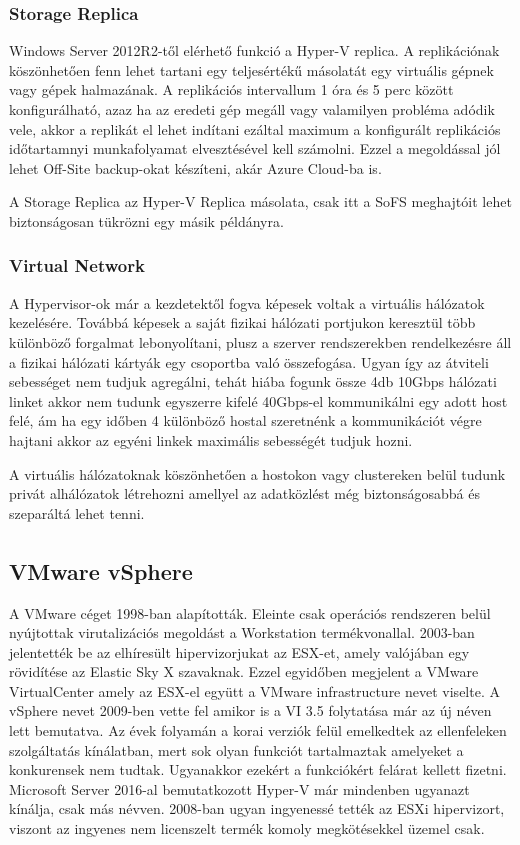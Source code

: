 \documentclass[12pt,oneside,justify,table]{book}
\begin{document}
\subsubsection{Storage Replica}

Windows Server 2012R2-től elérhető funkció a Hyper-V replica. A replikációnak köszönhetően fenn lehet tartani egy teljesértékű másolatát egy virtuális gépnek vagy gépek halmazának. A replikációs intervallum 1 óra és 5 perc között konfigurálható, azaz ha az eredeti gép megáll vagy valamilyen probléma adódik vele, akkor a replikát el lehet indítani ezáltal maximum a konfigurált replikációs időtartamnyi munkafolyamat elvesztésével kell számolni. Ezzel a megoldással jól lehet Off-Site backup-okat készíteni, akár Azure Cloud-ba is.

A Storage Replica az Hyper-V Replica másolata, csak itt a SoFS meghajtóit lehet biztonságosan tükrözni egy másik példányra.

\subsubsection{Virtual Network}

A Hypervisor-ok már a kezdetektől fogva képesek voltak a virtuális hálózatok kezelésére. Továbbá képesek a saját fizikai hálózati portjukon keresztül több különböző forgalmat lebonyolítani, plusz a szerver rendszerekben rendelkezésre áll a fizikai hálózati kártyák egy csoportba való összefogása. Ugyan így az átviteli sebességet nem tudjuk agregálni, tehát hiába fogunk össze 4db 10Gbps hálózati linket akkor nem tudunk egyszerre kifelé 40Gbps-el kommunikálni egy adott host felé, ám ha egy időben 4 különböző hostal szeretnénk a kommunikációt végre hajtani akkor az egyéni linkek maximális sebességét tudjuk hozni. 

A virtuális hálózatoknak köszönhetően a hostokon vagy clustereken belül tudunk privát alhálózatok létrehozni amellyel az adatközlést még biztonságosabbá és szeparáltá lehet tenni.

\subsection{VMware vSphere\textsuperscript{\textregistered}}
A VMware céget 1998-ban alapították. Eleinte csak operációs rendszeren belül nyújtottak virutalizációs megoldást a Workstation  termékvonallal. 2003-ban jelentették be az elhíresült hipervizorjukat az ESX-et, amely valójában egy rövidítése az Elastic Sky X szavaknak. Ezzel egyidőben megjelent a VMware VirtualCenter amely az ESX-el együtt a VMware infrastructure nevet viselte. A vSphere nevet 2009-ben vette fel amikor is a VI 3.5 folytatása már az új néven lett bemutatva. Az évek folyamán a korai verziók felül emelkedtek az ellenfeleken szolgáltatás kínálatban, mert sok olyan funkciót tartalmaztak amelyeket a konkurensek nem tudtak. Ugyanakkor ezekért a funkciókért felárat kellett fizetni. Microsoft Server 2016-al bemutatkozott Hyper-V már mindenben ugyanazt kínálja, csak más névven. 2008-ban ugyan ingyenessé tették az ESXi hipervizort, viszont az ingyenes nem licenszelt termék komoly megkötésekkel üzemel csak.  \\
\end{document}
